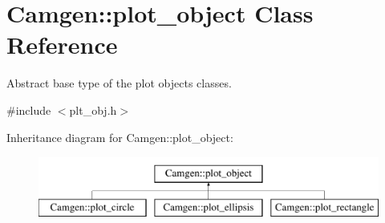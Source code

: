 \hypertarget{a00424}{\section{Camgen\-:\-:plot\-\_\-object Class Reference}
\label{a00424}
}


Abstract base type of the plot objects classes.  




{\ttfamily \#include $<$plt\-\_\-obj.\-h$>$}

Inheritance diagram for Camgen\-:\-:plot\-\_\-object\-:\begin{figure}[H]
\begin{center}
\leavevmode
\includegraphics[height=2.000000cm]{a00424}
\end{center}
\end{figure}
